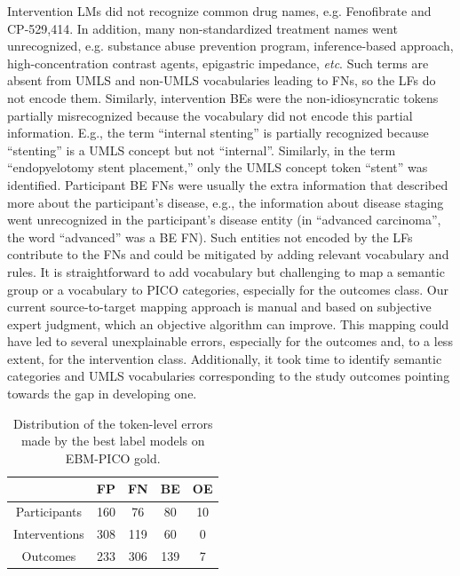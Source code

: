 \documentclass[10.7pt,]{article}
\begin{document}
Intervention LMs did not recognize common drug names, e.g. Fenofibrate and CP-529,414.
In addition, many non-standardized treatment names went unrecognized, e.g. substance abuse prevention program, inference-based approach, high-concentration contrast agents, epigastric impedance, \textit{etc}.
Such terms are absent from UMLS and non-UMLS vocabularies leading to FNs, so the LFs do not encode them.
Similarly, intervention BEs were the non-idiosyncratic tokens partially misrecognized because the vocabulary did not encode this partial information.
E.g., the term ``internal stenting'' is partially recognized because ``stenting'' is a UMLS concept but not ``internal''.
Similarly, in the term ``endopyelotomy stent placement,'' only the UMLS concept token ``stent'' was identified.
Participant BE FNs were usually the extra information that described more about the participant's disease, e.g., the information about disease staging went unrecognized in the participant's disease entity (in ``advanced carcinoma'', the word ``advanced'' was a BE FN).
Such entities not encoded by the LFs contribute to the FNs and could be mitigated by adding relevant vocabulary and rules.\cite{augenstein2017generalisation}
It is straightforward to add vocabulary but challenging to map a semantic group or a vocabulary to PICO categories, especially for the outcomes class.
Our current source-to-target mapping approach is manual and based on subjective expert judgment, which an objective algorithm can improve.
This mapping could have led to several unexplainable errors, especially for the outcomes and, to a less extent, for the intervention class.
Additionally, it took time to identify semantic categories and UMLS vocabularies corresponding to the study outcomes pointing towards the gap in developing one.
%
\begin{table}[h!]
\begin{center}
\begin{tabular}{| c | c | c | c | c |} 
\hline
 & FP & FN & BE & OE \\ 
\hline
Participants & 160 & 76 & 80 & 10 \\ 
Interventions & 308 & 119 & 60 & 0 \\ 
Outcomes & 233 & 306 & 139 & 7 \\ 
\hline
\end{tabular}
\caption{\label{tab:error_ner} Distribution of the token-level errors made by the best label models on EBM-PICO gold.}
\end{center}
\end{table}
%
%
%
\end{document}
